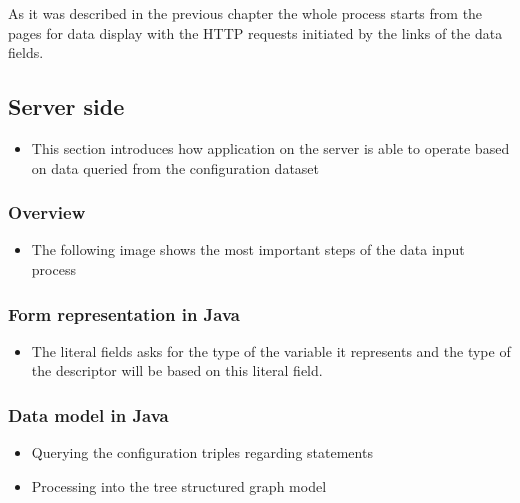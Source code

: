 As it was described in the previous chapter the whole process starts from the pages for data display with the HTTP requests initiated by the links of the data fields. 



\subsection{Server side} 

\begin{itemize}
	\item This section introduces how application on the server is able to operate based on data queried from the configuration dataset
	
\end{itemize}

\subsubsection{Overview}

\begin{itemize}
	\item The following image shows the most important steps of the data input process
\end{itemize}



\subsubsection{Form representation in Java}


\begin{itemize}
	\item The literal fields asks for the type of the variable it represents and the type of the descriptor will be based on this literal field.
\end{itemize}



\subsubsection{Data model in Java}


\begin{itemize}
	\item Querying the configuration triples regarding statements
	\item Processing into the tree structured graph model
\end{itemize}


